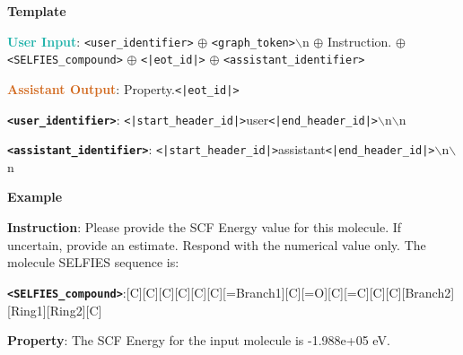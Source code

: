 \begin{tcolorbox}[colback=white!98!black,colframe=white!30!black,boxsep=1.1pt,top=6.75pt]%
\scriptsize
\noindent\makebox[\textwidth]{\rule{\textwidth}{1pt}}
\textbf{Template}
\\[-0.575em]
\noindent\makebox[\textwidth]{\rule{\textwidth}{1pt}}

\textbf{\textcolor[HTML]{20B2AA}{User Input}}: {\tt <user\_identifier>} $\oplus$ {\tt <graph\_token>}$\backslash$n $\oplus$ Instruction. $\oplus$ {\tt <SELFIES\_compound>} $\oplus$ {\tt <|eot\_id|>} $\oplus$ {\tt <assistant\_identifier>}

\textbf{\textcolor[HTML]{D2691E}{Assistant Output}}: Property.{\tt <|eot\_id|>}

{\tt \textbf{<user\_identifier>}}: {\tt <|start\_header\_id|>}user{\tt <|end\_header\_id|>}$\backslash$n$\backslash$n

{\tt \textbf{<assistant\_identifier>}}: {\tt <|start\_header\_id|>}assistant{\tt <|end\_header\_id|>}$\backslash$n$\backslash$n

\noindent\makebox[\textwidth]{\rule{\textwidth}{1pt}}
\textbf{Example}
\\[-0.575em]
\noindent\makebox[\textwidth]{\rule{\textwidth}{1pt}}

\begin{tcolorbox}[colback=cyan!7!white,colframe=white!98!black,boxsep=1.1pt,top=6.75pt]
\textbf{Instruction}: Please provide the SCF Energy value for this molecule. If uncertain, provide an estimate. Respond with the numerical value only. The molecule SELFIES sequence is:

{\tt \textbf{<SELFIES\_compound>}}:[C][C][C][C][C][C][=Branch1][C][=O][C][=C][C][C][Branch2][Ring1][Ring2][C]\-[C][=Branch1][C][=O][C][Ring1] [=Branch1][C][C][C][C][C][C][C][=Branch1][C][=O][O][O]

\end{tcolorbox}

\begin{tcolorbox}[colback=orange!7!white,colframe=white!98!black,boxsep=1.1pt,top=6.75pt]
\textbf{Property}: The SCF Energy for the input molecule is -1.988e+05 eV.
\end{tcolorbox}

\end{tcolorbox}

